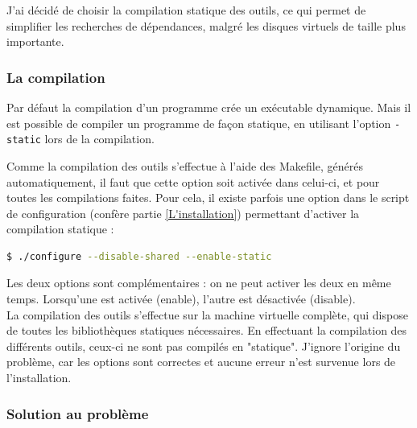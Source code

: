 J'ai décidé de choisir la compilation statique des outils, ce qui permet de simplifier les recherches de dépendances, malgré les disques virtuels de taille plus importante.
\\




\subsubsection{La compilation}

Par défaut la compilation d'un programme crée un exécutable dynamique.
Mais il est possible de compiler un programme de façon statique, en utilisant l'option \lstinline{-static} lors de la compilation.

Comme la compilation des outils s'effectue à l'aide des Makefile, générés automatiquement, il faut que cette option soit activée dans celui-ci, et pour toutes les compilations faites.
Pour cela, il existe parfois une option dans le script de configuration (confère partie \ref{L'installation}) permettant d'activer la compilation statique :
\begin{lstlisting}[language = sh]
$ ./configure --disable-shared --enable-static
\end{lstlisting}
Les deux options sont complémentaires : on ne peut activer les deux en même temps.
Lorsqu'une est activée (enable), l'autre est désactivée (disable).
\\


La compilation des outils s'effectue sur la machine virtuelle complète, qui dispose de toutes les bibliothèques statiques nécessaires.
En effectuant la compilation des différents outils, ceux-ci ne sont pas compilés en "statique".
J'ignore l'origine du problème, car les options sont correctes et aucune erreur n'est survenue lors de l'installation.
\\




\subsubsection{Solution au problème}
\label{Solution au problème}

